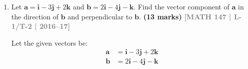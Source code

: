 \documentclass[12pt,a4paper]{article}
\newcommand{\yr}[1]{\hfill\textcolor{gray}{\small\textbf{[#1]}}}
\newcommand{\mk}[1]{\textcolor{orange!70!black}{\small\textbf{(#1 marks)}}}
\begin{document}
\begin{enumerate}
\begin{tcolorbox}[enhanced,breakable,ansbox,colback=cD!4,colframe=cD,boxrule=0.8pt,arc=5pt,title={\textbf{Answer}},fonttitle=\bfseries\color{white},colbacktitle=cD]
\begin{enumerate}
    \item \textbf{Median to side $\mathbf{C}$ (from vertex $O$ to midpoint of $PQ$):}
    The position vector of the midpoint of $PQ$ is $\mathbf{B} + \frac{1}{2}\mathbf{C}$. The median vector $\mathbf{m}_C$ is:
    \begin{align*}
        \mathbf{m}_C &= \left(\mathbf{B} + \frac{1}{2}\mathbf{C}\right) - \mathbf{0} \\
        &= (-\mathbf{i} + 3\mathbf{j} + 4\mathbf{k}) + \frac{1}{2}(4\mathbf{i} - 2\mathbf{j} - 6\mathbf{k}) \\
        &= (-\mathbf{i} + 2\mathbf{i}) + (3\mathbf{j} - \mathbf{j}) + (4\mathbf{k} - 3\mathbf{k}) \\
        &= \mathbf{i} + 2\mathbf{j} + \mathbf{k}
    \end{align*}
    Its length is:
    \[ |\mathbf{m}_C| = \sqrt{1^2 + 2^2 + 1^2} = \sqrt{1 + 4 + 1} = \boxed{\sqrt{6}} \]
\end{enumerate}

\end{tcolorbox}

\item Let $\mathbf{a}=\mathbf{i}-3\mathbf{j}+2\mathbf{k}$ and $\mathbf{b}=2\mathbf{i}-4\mathbf{j}-\mathbf{k}$. Find the vector component of $\mathbf{a}$ in the direction of $\mathbf{b}$ and perpendicular to $\mathbf{b}$.
\mk{13} \yr{MATH 147 | L-1/T-2 | 2016--17}

\begin{tcolorbox}[enhanced,breakable,ansbox,colback=cD!4,colframe=cD,boxrule=0.8pt,arc=5pt,title={\textbf{Answer}},fonttitle=\bfseries\color{white},colbacktitle=cD]

Let the given vectors be:
\begin{align*}
    \mathbf{a} &= \mathbf{i} - 3\mathbf{j} + 2\mathbf{k} \\
    \mathbf{b} &= 2\mathbf{i} - 4\mathbf{j} - \mathbf{k}
\end{align*}


\end{tcolorbox}
\end{enumerate}
\end{document}
